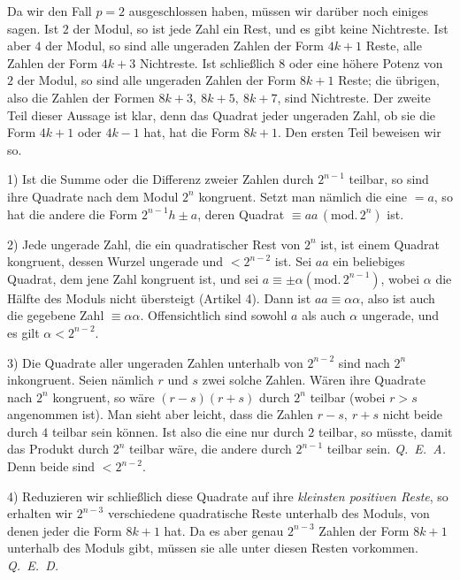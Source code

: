 Da wir den Fall $p=2$ ausgeschlossen haben, müssen wir darüber noch einiges sagen. Ist $2$ der Modul, so ist jede Zahl ein Rest, und es gibt keine Nichtreste. Ist aber $4$ der Modul, so sind alle ungeraden Zahlen der Form $4k+1$ Reste, alle Zahlen der Form $4k+3$ Nichtreste. Ist schließlich $8$ oder eine höhere Potenz von $2$ der Modul, so sind alle ungeraden Zahlen der Form $8k+1$ Reste; die übrigen, also die Zahlen der Formen $8k+3,\ 8k+5,\ 8k+7$, sind Nichtreste. Der zweite Teil dieser Aussage ist klar, denn das Quadrat jeder ungeraden Zahl, ob sie die Form $4k+1$ oder $4k-1$ hat, hat die Form $8k+1$. Den ersten Teil beweisen wir so.

1) Ist die Summe oder die Differenz zweier Zahlen durch $2^{n-1}$ teilbar, so sind ihre Quadrate nach dem Modul $2^n$ kongruent. Setzt man nämlich die eine $=a$, so hat die andere die Form $2^{n-1}h\pm a$, deren Quadrat $\equiv aa\,(\mathrm{mod.}\,2^n)$ ist.

2) Jede ungerade Zahl, die ein quadratischer Rest von $2^n$ ist, ist einem Quadrat kongruent, dessen Wurzel ungerade und $<2^{n-2}$ ist. Sei $aa$ ein beliebiges Quadrat, dem jene Zahl kongruent ist, und sei $a\equiv\pm\alpha (\mathrm{mod.}\,2^{n-1})$, wobei $\alpha$ die Hälfte des Moduls nicht übersteigt (Artikel 4). Dann ist $aa\equiv\alpha\alpha$, also ist auch die gegebene Zahl $\equiv\alpha\alpha$. Offensichtlich sind sowohl $a$ als auch $\alpha$ ungerade, und es gilt $\alpha<2^{n-2}$.

3) Die Quadrate aller ungeraden Zahlen unterhalb von $2^{n-2}$ sind nach $2^n$ inkongruent. Seien nämlich $r$ und $s$ zwei solche Zahlen. Wären ihre Quadrate nach $2^n$ kongruent, so wäre $(r-s)(r+s)$ durch $2^n$ teilbar (wobei $r>s$ angenommen ist). Man sieht aber leicht, dass die Zahlen $r-s,\ r+s$ nicht beide durch $4$ teilbar sein können. Ist also die eine nur durch $2$ teilbar, so müsste, damit das Produkt durch $2^n$ teilbar wäre, die andere durch $2^{n-1}$ teilbar sein. \mbox{\emph{Q. E. A.}} Denn beide sind $<2^{n-2}$.

4) Reduzieren wir schließlich diese Quadrate auf ihre \emph{kleinsten positiven Reste}, so erhalten wir $2^{n-3}$ verschiedene quadratische Reste unterhalb des Moduls, von denen jeder die Form $8k+1$ hat. Da es aber genau $2^{n-3}$ Zahlen der Form $8k+1$ unterhalb des Moduls gibt, müssen sie alle unter diesen Resten vorkommen. \mbox{\emph{Q. E. D.}}

